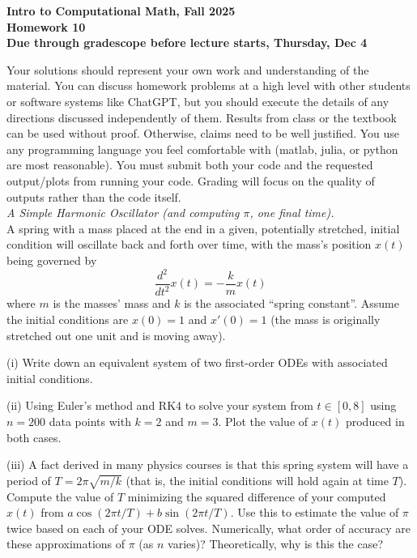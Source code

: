 \documentclass[11pt]{article}
\begin{document}
\begin{center}
{\bf Intro to Computational Math, Fall 2025 \\
Homework 10\\
Due through gradescope before lecture starts, Thursday, Dec 4}
\end{center}

Your solutions should represent your own work and understanding of the material. You can discuss homework problems at a high level with other students or software systems like ChatGPT, but you should execute the details of any directions discussed independently of them. Results from class or the textbook can be used without proof. Otherwise, claims need to be well justified. You use any programming language you feel comfortable with (matlab, julia, or python are most reasonable). You must submit both your code and the requested output/plots from running your code. Grading will focus on the quality of outputs rather than the code itself.\\

 {\it A Simple Harmonic Oscillator (and computing $\pi$, one final time).}\\
A spring with a mass placed at the end in a given, potentially stretched, initial condition will oscillate back and forth over time, with the mass's position $x(t)$ being governed by
$$ \frac{d^2}{dt^2} x(t) = -\frac{k}{m}x(t) $$
where $m$ is the masses' mass and $k$ is the associated ``spring constant''. Assume the initial conditions are $x(0)=1$ and $x'(0)=1$ (the mass is originally stretched out one unit and is moving away).

\noindent (i) Write down an equivalent system of two first-order ODEs with associated initial conditions.

\noindent (ii) Using Euler's method and RK4 to solve your system from $t\in[0,8]$ using $n=200$ data points with $k=2$ and $m=3$. Plot the value of $x(t)$ produced in both cases.

\noindent (iii) A fact derived in many physics courses is that this spring system will have a period of $T=2\pi \sqrt{m/k}$ (that is, the initial conditions will hold again at time $T$). Compute the value of $T$ minimizing the squared difference of your computed $x(t)$ from $a\cos(2\pi t/T)+b\sin(2\pi t/T)$. Use this to estimate the value of $\pi$ twice based on each of your ODE solves. Numerically, what order of accuracy are these approximations of $\pi$ (as $n$ varies)? Theoretically, why is this the case?
\end{document}

